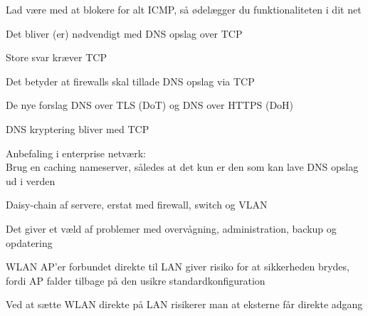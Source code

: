 \documentclass[Screen16to9,17pt]{foils}
\begin{document}
\begin{list1}
\item Lad være med at blokere for alt ICMP, så ødelægger du funktionaliteten i dit net
\end{list1}



\begin{list1}
\item Det bliver (er) nødvendigt med DNS opslag over TCP
\vskip 1cm
\item Store svar kræver TCP
\item Det betyder at firewalls skal tillade DNS opslag via TCP
\vskip 1cm
\item De nye forslag DNS over TLS (DoT) og DNS over HTTPS (DoH)
\item DNS kryptering bliver med TCP
\vskip 1cm
\item Anbefaling i enterprise netværk:\\
Brug en caching nameserver, således at det kun er den som kan lave DNS opslag ud i verden

\end{list1}



\begin{list1}
\item Daisy-chain af servere, erstat med firewall, switch og VLAN
\item Det giver et væld af problemer med overvågning, administration, backup og opdatering
\end{list1}



\begin{list1}
\item WLAN AP'er forbundet direkte til LAN giver risiko for at sikkerheden brydes, fordi AP falder tilbage på den usikre standardkonfiguration
\item Ved at sætte WLAN direkte på LAN risikerer man at eksterne får direkte adgang
\end{list1}



\end{document}
